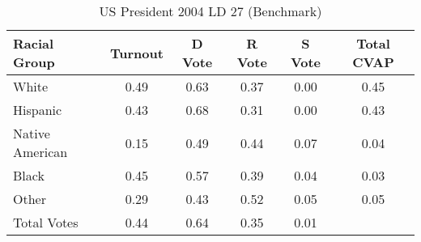 \begin{table}[htb]
\begin{center}
\caption{US President 2004 LD 27 (Benchmark)}
\label{pres04_cvap_ld_27_benchmark}
\begin{tabular}{lccccc}
  \hline
Racial Group & Turnout & D Vote & R Vote & S Vote & Total CVAP \\ 
  \hline
White & 0.49 & 0.63 & 0.37 & 0.00 & 0.45 \\ 
  Hispanic & 0.43 & 0.68 & 0.31 & 0.00 & 0.43 \\ 
  Native American & 0.15 & 0.49 & 0.44 & 0.07 & 0.04 \\ 
  Black & 0.45 & 0.57 & 0.39 & 0.04 & 0.03 \\ 
  Other & 0.29 & 0.43 & 0.52 & 0.05 & 0.05 \\ 
  Total Votes & 0.44 & 0.64 & 0.35 & 0.01 &  \\ 
   \hline
\end{tabular}
\end{center}
\end{table}
